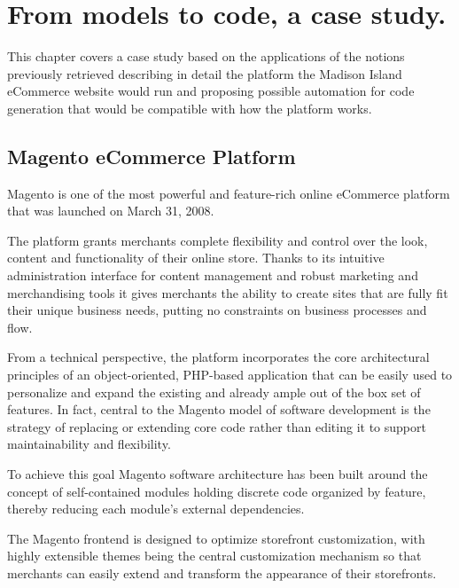 \chead{}

\chapter{From models to code, a case study.}

This chapter covers a case study based on the applications of the notions previously retrieved describing in detail the platform the Madison Island eCommerce website would run and proposing possible automation for code generation that would be compatible with how the platform works.

\section{Magento eCommerce Platform}

Magento is one of the most powerful and feature-rich online eCommerce platform that was launched on March 31, 2008. 

The platform grants merchants complete flexibility and control over the look, content and functionality of their online store. Thanks to its intuitive administration interface for content management and robust marketing and merchandising tools it gives merchants the ability to create sites that are fully fit their unique business needs, putting no constraints on business processes and flow.

From a technical perspective, the platform incorporates the core architectural principles of an object-oriented, PHP-based application that can be easily used to personalize and expand the existing and already ample out of the box set of features.
In fact, central to the Magento model of software development is the strategy of replacing or extending core code rather than editing it to support maintainability and flexibility. 

To achieve this goal Magento software architecture has been built around the concept of self-contained modules holding discrete code organized by feature, thereby reducing each module’s external dependencies.

The Magento frontend is designed to optimize storefront customization, with highly extensible themes being the central customization mechanism so that merchants can easily extend and transform the appearance of their storefronts.



